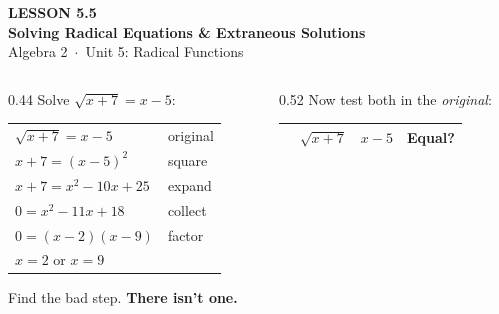 \documentclass[aspectratio=169, 11pt]{beamer}
\begin{document}
{
\begin{frame}[plain]
  \vspace{2.8cm}\hspace{0.55cm}%
  \begin{minipage}{0.9\textwidth}
    {\color{goldacc}\bfseries\small LESSON 5.5}\\[0.5cm]
    {\color{white}\bfseries\LARGE Solving Radical Equations \& Extraneous Solutions}\\[1.2cm]
    {\color{forestmid}\small Algebra 2~$\cdot$~Unit 5: Radical Functions}
  \end{minipage}
\end{frame}
}

\begin{frame}[t, plain]
  \begin{columns}[T]
    \begin{column}{0.44\textwidth}
      \footnotesize
      Solve $\sqrt{x+7}=x-5$:
      \vspace{3pt}
      \begin{center}
      \renewcommand{\arraystretch}{1.3}
      \begin{tabular}{@{}l l@{}}
      $\sqrt{x+7}=x-5$ & original \\
      $x+7=(x-5)^{2}$ & square \\
      $x+7=x^{2}-10x+25$ & expand \\
      $0=x^{2}-11x+18$ & collect \\
      $0=(x-2)(x-9)$ & factor \\
      $x=2$ \; or \; $x=9$ & \\
      \end{tabular}
      \end{center}
      \vspace{2pt}
      Find the bad step. \textbf{There isn't one.}
    \end{column}
    \begin{column}{0.52\textwidth}
      \footnotesize
      Now test both in the \emph{original}:
      \vspace{3pt}
      \begin{center}
      \renewcommand{\arraystretch}{1.3}
      \begin{tabular}{|c|c|c|c|}
      \hline
       & $\sqrt{x+7}$ & $x-5$ & Equal? \\ \hline

\end{tabular}
\end{center}
\end{column}
\end{columns}
\end{frame}
\end{document}
